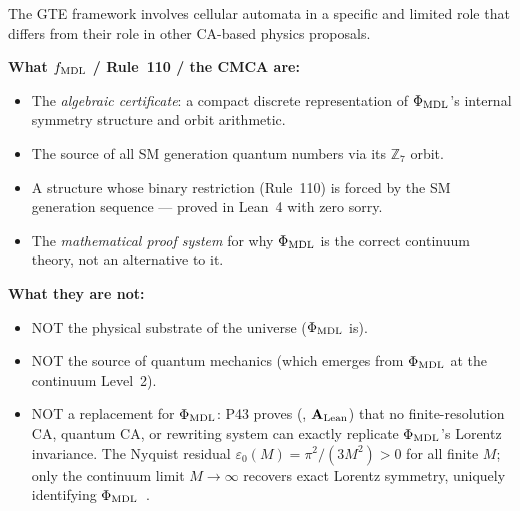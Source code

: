 \begin{tcolorbox}[colback=blue!3,colframe=blue!50!black,
  title={\textbf{The role of cellular automata in the GTE framework}},
  fonttitle=\bfseries,left=6pt,right=6pt,top=5pt,bottom=5pt]
\small
The GTE framework involves cellular automata in a specific and limited role
that differs from their role in other CA-based physics proposals.

\textbf{What $f_{\rm MDL}$ / Rule~110 / the CMCA are:}
\begin{itemize}[noitemsep,topsep=2pt]
  \item The \emph{algebraic certificate}: a compact discrete representation of
    $\Phi_{\rm MDL}$'s internal symmetry structure and orbit arithmetic.
  \item The source of all SM generation quantum numbers via its $\mathbb{Z}_7$ orbit.
  \item A structure whose binary restriction (Rule~110) is forced by the SM
    generation sequence --- proved in Lean~4 with zero sorry.
  \item The \emph{mathematical proof system} for why $\Phi_{\rm MDL}$ is the correct
    continuum theory, not an alternative to it.
\end{itemize}
\textbf{What they are not:}
\begin{itemize}[noitemsep,topsep=2pt]
  \item NOT the physical substrate of the universe ($\Phi_{\rm MDL}$ is).
  \item NOT the source of quantum mechanics (which emerges from $\Phi_{\rm MDL}$
    at the continuum Level~2).
  \item NOT a replacement for $\Phi_{\rm MDL}$: P43 proves
    (, $\mathbf{A}_{\rm Lean}$) that
    no finite-resolution CA, quantum CA, or rewriting system can exactly replicate
    $\Phi_{\rm MDL}$'s Lorentz invariance.  The Nyquist residual
    $\varepsilon_0(M) = \pi^2/(3M^2) > 0$ for all finite $M$; only the continuum
    limit $M \to \infty$ recovers exact Lorentz symmetry, uniquely identifying
    $\Phi_{\rm MDL}$~\cite{SpivackCompleteness}.
\end{itemize}
\end{tcolorbox}

